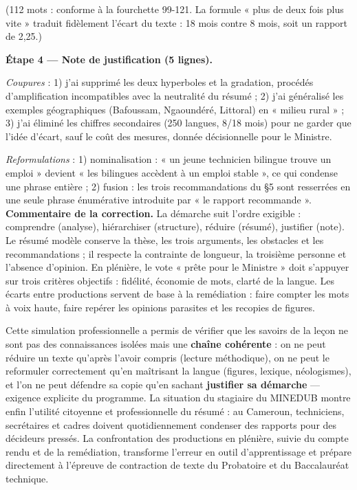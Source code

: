 \documentclass[11pt]{article}
\newcounter{popsec}
\newcounter{popsub}
\newcommand{\courssub}[1]{%
  \stepcounter{popsub}%
  \par\vspace{9pt}\noindent{\popxbold\fontsize{11.5}{13}\selectfont\color{popink}{\color{poporange}\thepopsec.\thepopsub}\hspace{6pt}#1}\par\nopagebreak\vspace{4pt}
}
\begin{document}
\begin{exoresolu}
(112 mots : conforme à la fourchette 99-121. La formule « plus de deux fois plus vite » traduit fidèlement l'écart du texte : 18 mois contre 8 mois, soit un rapport de 2,25.)

\textbf{Étape 4 — Note de justification (5 lignes).}

\emph{Coupures} : 1) j'ai supprimé les deux hyperboles et la gradation, procédés d'amplification incompatibles avec la neutralité du résumé ; 2) j'ai généralisé les exemples géographiques (Bafoussam, Ngaoundéré, Littoral) en « milieu rural » ; 3) j'ai éliminé les chiffres secondaires (250 langues, 8/18 mois) pour ne garder que l'idée d'écart, sauf le coût des mesures, donnée décisionnelle pour le Ministre.

\emph{Reformulations} : 1) nominalisation : « un jeune technicien bilingue trouve un emploi » devient « les bilingues accèdent à un emploi stable », ce qui condense une phrase entière ; 2) fusion : les trois recommandations du §5 sont resserrées en une seule phrase énumérative introduite par « le rapport recommande ».
\tcblower
\textbf{Commentaire de la correction.} La démarche suit l'ordre exigible : comprendre (analyse), hiérarchiser (structure), réduire (résumé), justifier (note). Le résumé modèle conserve la thèse, les trois arguments, les obstacles et les recommandations ; il respecte la contrainte de longueur, la troisième personne et l'absence d'opinion. En plénière, le vote « prête pour le Ministre » doit s'appuyer sur trois critères objectifs : fidélité, économie de mots, clarté de la langue. Les écarts entre productions servent de base à la remédiation : faire compter les mots à voix haute, faire repérer les opinions parasites et les recopies de figures.
\end{exoresolu}

\courssub{Bilan de l'activité}

Cette simulation professionnelle a permis de vérifier que les savoirs de la leçon ne sont pas des connaissances isolées mais une \textbf{chaîne cohérente} : on ne peut réduire un texte qu'après l'avoir compris (lecture méthodique), on ne peut le reformuler correctement qu'en maîtrisant la langue (figures, lexique, néologismes), et l'on ne peut défendre sa copie qu'en sachant \textbf{justifier sa démarche} — exigence explicite du programme. La situation du stagiaire du MINEDUB montre enfin l'utilité citoyenne et professionnelle du résumé : au Cameroun, techniciens, secrétaires et cadres doivent quotidiennement condenser des rapports pour des décideurs pressés. La confrontation des productions en plénière, suivie du compte rendu et de la remédiation, transforme l'erreur en outil d'apprentissage et prépare directement à l'épreuve de contraction de texte du Probatoire et du Baccalauréat technique.
\end{document}
